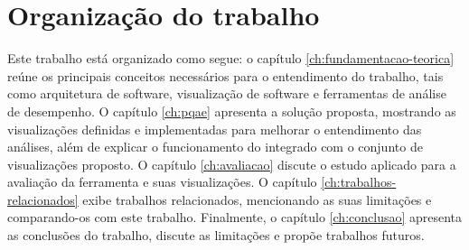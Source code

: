 \section{Organização do trabalho} \label{sec:organizacao-trabalho}

Este trabalho está organizado como segue: o capítulo \ref{ch:fundamentacao-teorica} reúne os principais conceitos necessários para o entendimento do trabalho, tais como arquitetura de software, visualização de software e ferramentas de análise de desempenho. O capítulo \ref{ch:pqae} apresenta a solução proposta, mostrando as visualizações definidas e implementadas para melhorar o entendimento das análises, além de explicar o funcionamento do \textit{\perfMinerName} integrado com o conjunto de visualizações proposto. O capítulo \ref{ch:avaliacao} discute o estudo aplicado para a avaliação da ferramenta e suas visualizações. O capítulo \ref{ch:trabalhos-relacionados} exibe trabalhos relacionados, mencionando as suas limitações e comparando-os com este trabalho. Finalmente, o capítulo \ref{ch:conclusao} apresenta as conclusões do trabalho, discute as limitações e propõe trabalhos futuros.